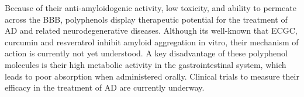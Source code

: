 


Because of their anti-amyloidogenic activity, low toxicity, and ability to permeate across the BBB, polyphenols display therapeutic potential for the treatment of AD and related neurodegenerative diseases.  Although its well-known that ECGC, curcumin and resveratrol inhibit amyloid aggregation in vitro, their mechanism of action is currently not yet understood. A key disadvantage of these polyphenol molecules is their high metabolic activity in the gastrointestinal system, which leads to poor absorption when administered orally.\cite{Baur:2006bx,Smith:2011iq,Hamaguchi:2010wu} Clinical trials to measure their efficacy in the treatment of AD are currently underway.



